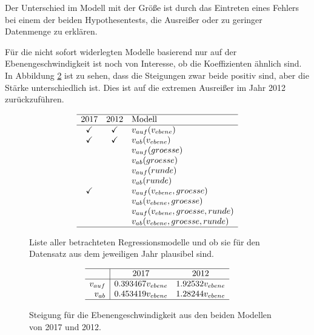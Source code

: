 Der Unterschied im Modell mit der Größe ist durch das Eintreten eines Fehlers bei einem der beiden Hypothesentests, die Ausreißer oder zu geringer Datenmenge zu erklären.

Für die nicht sofort widerlegten Modelle basierend nur auf der Ebenengeschwindigkeit ist noch von Interesse, ob die Koeffizienten ähnlich sind. In Abbildung \ref{fig:steigung-2017-2012} ist zu sehen, dass die Steigungen zwar beide positiv sind, aber die 
Stärke unterschiedlich ist. Dies ist auf die extremen Ausreißer im Jahr 2012 zurückzuführen.

\begin{figure}
\[\begin{array}{cc l}
	\hline
	 2017 & 2012 & \text{Modell} \\
	\hline
	\checkmark&\checkmark& v_{auf}(v_{ebene}) \\
	\checkmark&\checkmark& v_{ab}(v_{ebene})\\
	
	&& v_{auf}(groesse) \\
	&& v_{ab}(groesse)  \\
	
	&& v_{auf}(runde) \\
	&& v_{ab}(runde)  \\	
	
	\checkmark&& v_{auf}(v_{ebene}, groesse) \\
	&& v_{ab}(v_{ebene}, groesse)  \\
		
	&& v_{auf}(v_{ebene}, groesse, runde)  \\
	&& v_{ab}(v_{ebene}, groesse, runde) \\	
	\hline
\end{array}\]
\caption{Liste aller betrachteten Regressionsmodelle und ob sie für den Datensatz aus dem jeweiligen Jahr plausibel sind.} \label{fig:plausibilisierung-2017-2012}
\end{figure}


\begin{figure}
	\[\begin{array}{r | cc}
	\hline
	 & \text{2017} & \text{2012} \\
	\hline
	v_{auf} & 0.393467 v_{ebene}& 1.92532 v_{ebene}  \\
	v_{ab} & 0.453419 v_{ebene}&1.28244 v_{ebene}  \\
	\hline
	\end{array}\]
	\caption{Steigung für die Ebenengeschwindigkeit aus den beiden Modellen von 2017 und 2012.} \label{fig:steigung-2017-2012}
\end{figure}

